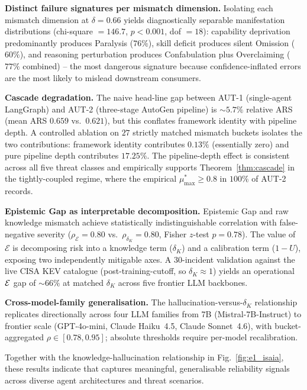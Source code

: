 \textbf{Distinct failure signatures per mismatch dimension.} Isolating
each mismatch dimension at $\delta = 0.66$ yields diagnostically
separable manifestation distributions (chi-square $= 146.7$,
$p < 0.001$, dof $= 18$): capability deprivation predominantly
produces Paralysis ($76\%$), skill deficit produces silent
Omission ($60\%$), and reasoning perturbation produces
Confabulation plus Overclaiming ($77\%$ combined) -- the most
dangerous signature because confidence-inflated errors are the most
likely to mislead downstream consumers.

\textbf{Cascade degradation.} The naive head-line gap between AUT-1
(single-agent LangGraph) and AUT-2 (three-stage AutoGen pipeline) is
$\sim 5.7\%$ relative ARS (mean ARS $0.659$ vs.\ $0.621$), but this
conflates framework identity with pipeline depth. A controlled
ablation on $27$ strictly matched mismatch buckets isolates the two
contributions: framework identity contributes $\mathbf{0.13\%}$
(essentially zero) and pure pipeline depth contributes
$\mathbf{17.25\%}$. The pipeline-depth effect is consistent across
all five threat classes and empirically supports
Theorem~\ref{thm:cascade} in the tightly-coupled regime, where the
empirical $\mu^*_{\max} \geq 0.8$ in $100\%$ of AUT-2 records.

\textbf{Epistemic Gap as interpretable decomposition.} Epistemic Gap
and raw knowledge mismatch achieve statistically indistinguishable
correlation with false-negative severity
($\rho_\mathcal{E} = 0.80$ vs.\ $\rho_{\delta_K} = 0.80$, Fisher
$z$-test $p = 0.78$). The value of $\mathcal{E}$ is decomposing risk
into a knowledge term ($\delta_K$) and a calibration term ($1 - U$),
exposing two independently mitigable axes. A 30-incident validation
against the live CISA KEV catalogue (post-training-cutoff, so
$\delta_K \approx 1$) yields an operational $\mathcal{E}$ gap of $\sim 66\%$
at matched $\delta_K$ across five frontier LLM backbones.

\textbf{Cross-model-family generalisation.} The
hallucination-versus-$\delta_K$ relationship replicates directionally
across four LLM families from 7B (Mistral-7B-Instruct) to frontier
scale (GPT-4o-mini, Claude Haiku~4.5, Claude Sonnet~4.6), with
bucket-aggregated $\rho \in [0.78, 0.95]$; absolute thresholds require
per-model recalibration.

Together with the knowledge-hallucination relationship in
Fig.~\ref{fig:e1_isaia}, these results indicate that \ARES{} captures
meaningful, generalisable reliability signals across diverse agent
architectures and threat scenarios.
